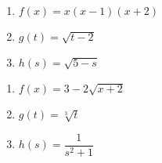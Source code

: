 \documentclass{ximera}
\begin{document}
\begin{enumerate}

\item $f(x) = x(x-1)(x+2)$
\item $g(t) = \sqrt{t-2}$
\item $h(s) = \sqrt{5 - s}$

\end{enumerate}


\begin{enumerate}

\item $f(x) = 3-2\sqrt{x+2}$
\item $g(t) = \sqrt[3]{t}$
\item $h(s) = \dfrac{1}{s^{2} + 1}$ \label{sketchgraphlast}

\end{enumerate}
\end{document}
